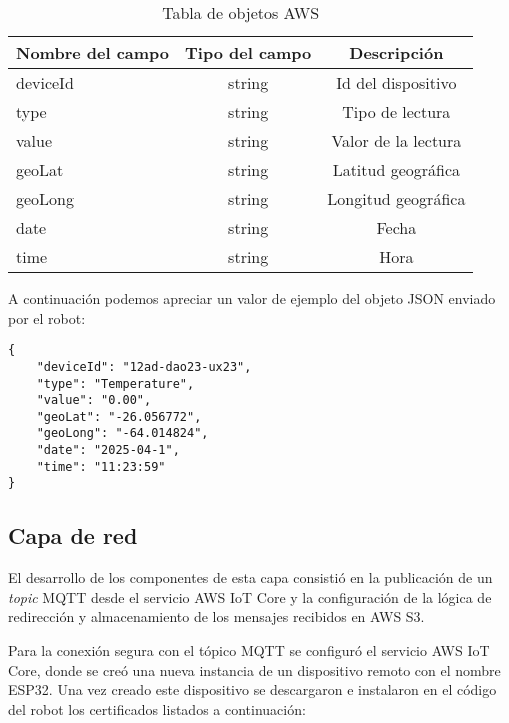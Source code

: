 \begin{table}[h]
	\centering
	\caption[caption corto]{Tabla de objetos AWS}
	\begin{tabular}{l c c}    
		\toprule
		\textbf{Nombre del campo} & \textbf{Tipo del campo} & \textbf{Descripción}  \\
		\midrule
		deviceId & string & Id del dispositivo \\		
		type & string & Tipo de lectura \\		
		value & string & Valor de la lectura \\		
		geoLat & string & Latitud geográfica \\		
		geoLong & string & Longitud geográfica\\		
		date & string & Fecha \\		
		time & string & Hora \\		
		
		\bottomrule
		\hline
	\end{tabular}
	\label{tab:json_fields}
\end{table}


A continuación podemos apreciar un valor de ejemplo del objeto JSON enviado por el robot:

\begin{lstlisting}
{   	
	"deviceId": "12ad-dao23-ux23",
	"type": "Temperature",
	"value": "0.00",
	"geoLat": "-26.056772",
	"geoLong": "-64.014824",
	"date": "2025-04-1",
	"time": "11:23:59"
}
\end{lstlisting}

\subsection{Capa de red}

El desarrollo de los componentes de esta capa consistió en la publicación de un \textit{topic} MQTT desde el servicio AWS IoT Core y la configuración de la lógica de redirección y almacenamiento de los mensajes recibidos en AWS S3.


Para la conexión segura con el tópico MQTT se configuró el servicio AWS IoT Core, donde se creó una nueva instancia de un dispositivo remoto con el nombre ESP32. Una vez creado este dispositivo se descargaron e instalaron en el código del robot los certificados listados a continuación:




